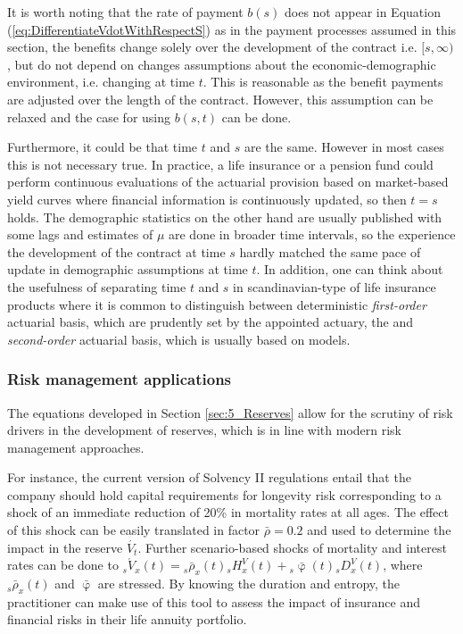 \documentclass[12pt]{article}
\begin{document}
It is worth noting that the rate of payment $b(s)$ does not appear in Equation (\ref{eq:DifferentiateVdotWithRespectS}) as in the payment processes assumed in this section, the benefits change solely over the development of the contract i.e. $[s,\infty)$, but do not depend on changes assumptions about the economic-demographic environment, i.e. changing at time $t$. This is reasonable as the benefit payments are adjusted over the length of the contract. However, this assumption can be relaxed and the case for using $b(s,t)$ can be done. 

Furthermore, it could be that time $t$ and $s$ are the same. However in most  cases this is not necessary true. In practice, a life insurance or a pension fund could perform continuous evaluations of the actuarial provision based on market-based yield curves where financial information is continuously updated, so then $t=s$ holds. The demographic statistics on the other hand are usually published with some lags and estimates of $\mu$ are done in broader time intervals, so the experience the development of the contract at time $s$ hardly matched the same pace of update in demographic assumptions at time $t$. In addition, one can think about the usefulness of separating time $t$ and $s$ in  scandinavian-type of life insurance products where it is common to distinguish between deterministic \textit{first-order} actuarial basis, which are prudently set by the appointed actuary, the and \textit{second-order} actuarial basis, which is usually based on models.

\subsubsection{Risk management applications}

The equations developed in Section \ref{sec:5_Reserves} allow for the scrutiny of risk drivers in the development of reserves, which is in line with modern risk management approaches.

For instance, the current version of Solvency II regulations entail that the company should hold capital requirements for longevity risk corresponding to a shock of an immediate reduction of 20\% in mortality rates at all ages. The effect of this shock can be easily translated in factor $\bar{\rho}=0.2$ and used to determine the impact in the reserve $\acute{V_t}$. Further scenario-based shocks of mortality and interest rates can be done to ${}_s\acute{V}_x(t)= {}_s\bar{\rho}_x(t) {}_sH_x^V(t) + {}_s\bar{\upvarphi}(t) {}_sD_x^V(t)$, where ${}_s\bar{\rho}_x(t)$ and $\bar{\upvarphi}$ are stressed. By knowing the duration and entropy, the practitioner can make use of this tool to assess the impact of insurance and financial risks in their life annuity portfolio.
\end{document}
